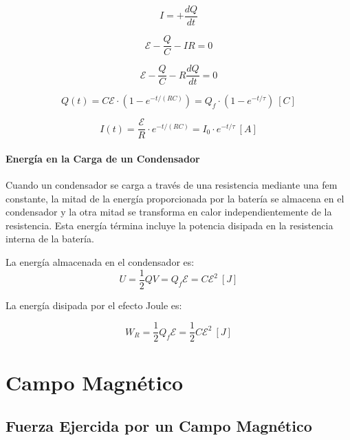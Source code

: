 \documentclass{tufte-handout}
\begin{document}
\begin{equation}
I = +\frac{dQ}{dt}
\end{equation}    

\begin{equation}
\mathcal{E}-\frac{Q}{C}-IR = 0
\end{equation}

\begin{equation}
\mathcal{E}-\frac{Q}{C}-R\frac{dQ}{dt} = 0
\end{equation}

\begin{equation}
Q(t) = C\mathcal{E} \cdot (1-e^{-t/(RC)}) = Q_f\cdot (1-e^{-t/\tau})~[C]
\end{equation}

\begin{equation}
I(t) = \frac{\mathcal{E}}{R}\cdot e^{-t/(RC)} = I_0\cdot e^{-t/\tau}~[A]
\end{equation}

\paragraph{Energía en la Carga de un Condensador}

Cuando un condensador se carga a través de una resistencia mediante una fem constante, la mitad de la energía proporcionada por la batería se almacena en el condensador y la otra mitad se transforma en calor independientemente de la resistencia. Esta energía términa incluye la potencia disipada en la resistencia interna de la batería.

La energía almacenada en el condensador es:
\begin{equation}
U = \frac{1}{2}QV = Q_f\mathcal{E} = C\mathcal{E}^2~[J]
\end{equation}

La energía disipada por el efecto Joule es:

\begin{equation}
W_R = \frac{1}{2}Q_f\mathcal{E} = \frac{1}{2}C\mathcal{E}^2~[J]
\end{equation}

\clearpage

\section{Campo Magnético}

\subsection{Fuerza Ejercida por un Campo Magnético}
\end{document}
